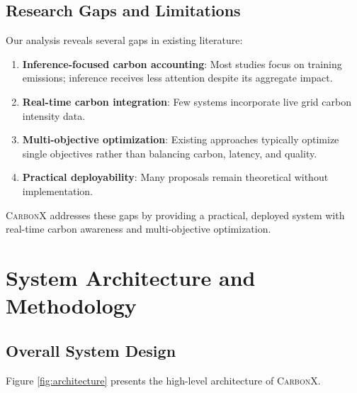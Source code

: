 \documentclass[conference]{IEEEtran}
\newcommand{\carbonx}{\textsc{CarbonX}}
\begin{document}
\subsection{Research Gaps and Limitations}

Our analysis reveals several gaps in existing literature:

\begin{enumerate}
    \item \textbf{Inference-focused carbon accounting}: Most studies focus on training emissions; inference receives less attention despite its aggregate impact.
    \item \textbf{Real-time carbon integration}: Few systems incorporate live grid carbon intensity data.
    \item \textbf{Multi-objective optimization}: Existing approaches typically optimize single objectives rather than balancing carbon, latency, and quality.
    \item \textbf{Practical deployability}: Many proposals remain theoretical without implementation.
\end{enumerate}

\carbonx{} addresses these gaps by providing a practical, deployed system with real-time carbon awareness and multi-objective optimization.

\section{System Architecture and Methodology}

\subsection{Overall System Design}

Figure \ref{fig:architecture} presents the high-level architecture of \carbonx{}.
\end{document}
